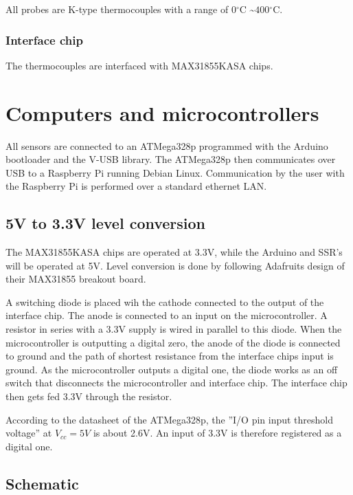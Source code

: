 \documentclass[11pt,fleqn,openany]{book} %
\newcommand{\degree}{\ensuremath{^\circ}}
\begin{document}
All probes are K-type thermocouples with a range of $0\degree$C \textasciitilde $400\degree$C.

\subsubsection{Interface chip}

The thermocouples are interfaced with MAX31855KASA chips.

\section{Computers and microcontrollers}

All sensors are connected to an ATMega328p programmed with the Arduino bootloader and the V-USB library. The ATMega328p then communicates over USB to a Raspberry Pi running Debian Linux. Communication by the user with the Raspberry Pi is performed over a standard ethernet LAN.

\subsection{5V to 3.3V level conversion}

The MAX31855KASA chips are operated at 3.3V, while the Arduino and SSR's will be operated at 5V. Level conversion is done by following Adafruits design of their MAX31855 breakout board.

A switching diode is placed wih the cathode connected to the output of the interface chip. The anode is connected to an input on the microcontroller. A resistor in series with a 3.3V supply is wired in parallel to this diode. When the microcontroller is outputting a digital zero, the anode of the diode is connected to ground and the path of shortest resistance from the interface chips input is ground. As the microcontroller outputs a digital one, the diode works as an off switch that disconnects the microcontroller and interface chip. The interface chip then gets fed 3.3V through the resistor.

According to the datasheet of the ATMega328p, the ''I/O pin input threshold voltage'' at $V_{cc} = 5V$ is about 2.6V. An input of 3.3V is therefore registered as a digital one.


\subsection{Schematic}
\end{document}
